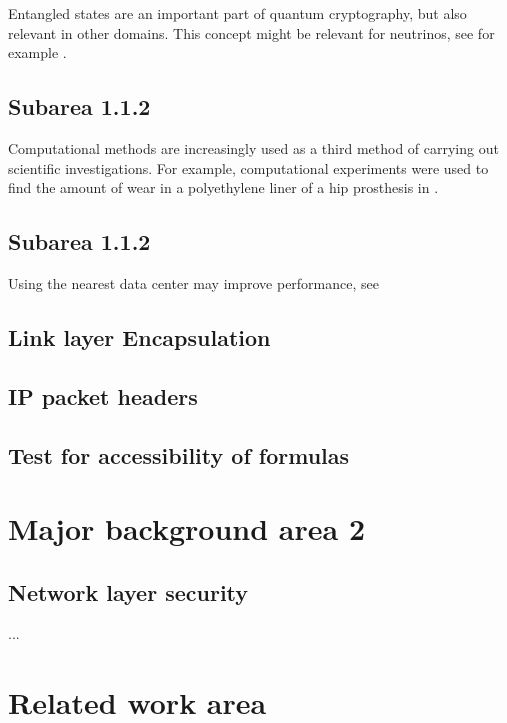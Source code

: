 Entangled states are an important part of quantum cryptography, but also relevant in other domains. This concept might be relevant for neutrinos, see for example \cite{kim_small-mass_2016}.

\subsection{Subarea 1.1.2}

Computational methods are increasingly used as a third method of carrying out
scientific investigations. For example, computational experiments were used to
find the amount of wear in a polyethylene liner of a hip prosthesis in \cite{maguire_jr_new_2014}.

\subsection{Subarea 1.1.2}

Using the nearest data center may improve performance, see \cite{bogdanov_nearest_2015}


\subsection{Link layer Encapsulation}

\label{sec:llencap}

\subsection{IP packet headers}

\label{sec:ipheaders}

\subsection{Test for accessibility of formulas}

\section{Major background area 2}

\subsection{Network layer security}

...

\section{Related work area}


